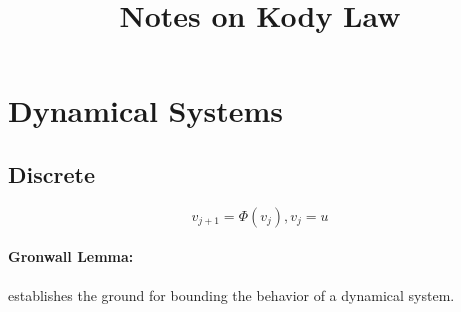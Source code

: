 \documentclass[10pt,a4paper]{article}
\begin{document}
\title{Notes on Kody Law}
\section{Dynamical Systems}
\subsection{Discrete}
\[v_{j+1}=\Phi(v_j),v_j=u\]
\paragraph{Gronwall Lemma:} establishes the ground for bounding the behavior of a dynamical system.
\end{document}
